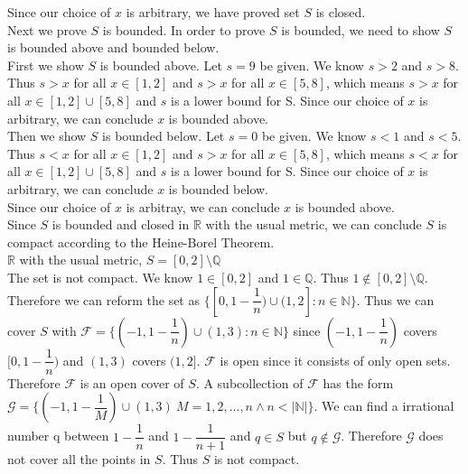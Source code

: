 \documentclass{article}
\begin{document}
	Since our choice of $x$ is arbitrary, we have proved set $S$ is closed.\\
	
	Next we prove $S$ is bounded. In order to prove $S$ is bounded, we need to show $S$ is bounded above and bounded below.\\
	
	First we show $S$ is bounded above. Let $s = 9$ be given. We know $s>2$ and $s>8$. Thus $s>x$ for all $x \in [1,2]$ and $s>x$ for all $x \in [5,8]$, which means $s>x$ for all $x \in [1,2] \cup [5,8]$ and $s$ is a lower bound for S. Since our choice of $x$ is arbitrary, we can conclude $x$ is bounded above.\\ 
	
	Then we show $S$ is bounded below. Let $s = 0$ be given. We know $s<1$ and $s<5$. Thus $s<x$ for all $x \in [1,2]$ and $s>x$ for all $x \in [5,8]$, which means $s<x$ for all $x \in [1,2] \cup [5,8]$ and $s$ is a lower bound for S. Since our choice of $x$ is arbitrary, we can conclude $x$ is bounded below.\\ 
	
	Since our choice of $x$ is arbitray, we can conclude $x$ is bounded above.\\
	
	Since $S$ is bounded and closed in $\mathbb{R}$ with the usual metric, we can conclude $S$ is compact according to the Heine-Borel Theorem.\\
	
	\noindent $\mathbb{R}$ with the usual metric, $S = [0, 2] \setminus \mathbb{Q}$\\
	
	The set is not compact. We know $1 \in [0,2]$ and $1 \in \mathbb{Q}$. Thus $1 \notin [0,2] \setminus \mathbb{Q}$. Therefore we can reform the set as $\{[0,1-\dfrac{1}{n}) \cup (1,2]:n \in \mathbb{N}\}$. Thus we can cover $S$ with $\mathcal{F} = \{(-1,1-\dfrac{1}{n}) \cup (1,3): n \in \mathbb{N}\}$ since $(-1,1-\dfrac{1}{n})$ covers $[0,1-\dfrac{1}{n})$ and $(1,3)$ covers $(1,2]$. $\mathcal{F}$ is open since it consists of only open sets. Therefore $\mathcal{F}$ is an open cover of $S$. A subcollection of $\mathcal{F}$ has the form $\mathcal{G} = \{(-1,1-\dfrac{1}{M}) \cup (1,3)\:M=1,2,...,n \land n<|\mathbb{N}|\}$. We can find a irrational number q between $1-\dfrac{1}{n}$ and $1-\dfrac{1}{n+1}$ and $q \in S$ but $q \notin \mathcal{G}$. Therefore $\mathcal{G}$ does not cover all the points in $S$. Thus $S$ is not compact. \\
	
\end{document}
